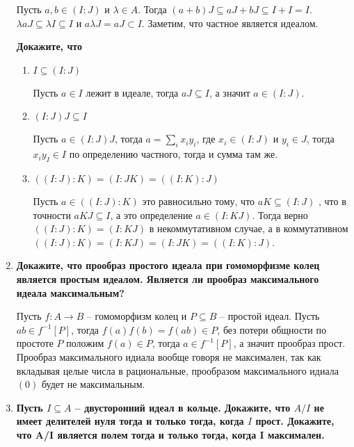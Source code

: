 \documentclass{article}
\begin{document}
\begin{enumerate}
        Пусть $a,b\in (I:J)$ и $\lambda\in A$. Тогда $(a+b)J\subseteq aJ+bJ
        \subseteq I+I=I$. $\lambda aJ\subseteq \lambda I\subseteq I$ и
        $a\lambda J=aJ\subset I$. Заметим, что частное является идеалом.
        
        \textbf{Докажите, что}
        \begin{enumerate}
            \item $I\subseteq (I : J)$

                Пусть $a\in I$ лежит в идеале, тогда $aJ\subseteq I$, а
                значит $a\in(I:J)$.

            \item $(I:J)J\subseteq I$

                Пусть $a\in(I:J)J$, тогда $a=\sum_ix_iy_i$, где $x_i\in(I:J)$
                и $y_i\in J$, тогда $x_iy_I\in I$ по определению частного, тогда
                и сумма там же.

            \item $((I:J):K)=(I:JK)=((I :K):J)$

                Пусть $a\in((I:J):K)$ это равносильно тому, что $aK\subseteq(I:J)$
                , что в точности $aKJ\subseteq I$, а это определение $a\in(I:KJ)$.
                Тогда верно $((I:J):K)=(I:KJ)$ в некоммутативном случае, а в
                коммутативном $((I:J):K)=(I:KJ)=(I:JK)=((I:K):J)$.
        \end{enumerate}

    \item \textbf{Докажите, что прообраз простого идеала при гомоморфизме колец
        является простым идеалом. Является ли прообраз максимального идеала
        максимальным?}

        Пусть $f:A\longrightarrow B$ – гомоморфизм колец и $P\subseteq B$ –
        простой идеал. Пусть $ab\in f^{-1}[P]$, тогда $f(a)f(b)=f(ab)\in P$,
        без потери общности по простоте $P$ положим $f(a)\in P$, тогда $a\in
        f^{-1}[P]$, а значит прообраз прост. Прообраз максимального идиала
        вообще говоря не максимален, так как вкладывая целые числа в рациональные,
        прообразом максимального идиала $(0)$ будет не максимальным.

    \item \textbf{Пусть $I\subseteq A$ – двусторонний идеал в кольце. Докажите,
        что $A/I$ не имеет делителей нуля тогда и только тогда, когда $I$ прост.
        Докажите, что A/I является полем тогда и только тогда, когда I максимален.}


\end{enumerate}
\end{document}
